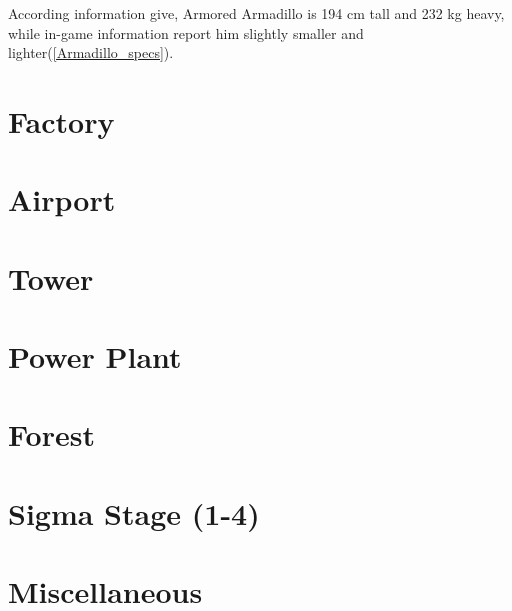 According information give, Armored Armadillo is 194 cm tall and 232 kg heavy, while in-game information report him slightly smaller and lighter(\ref{Armadillo_specs}).
\section{Factory}
\section{Airport}
\section{Tower}
\section{Power Plant}
\section{Forest}
\section{Sigma Stage (1-4)}
\section{Miscellaneous}\label{X1:misc} %